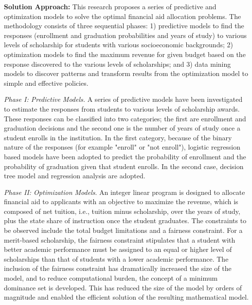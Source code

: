 \documentclass[12pt,english]{report}
\begin{document}
\newpage
\noindent \textbf{Solution Approach:}  This research proposes a series of predictive and optimization models to solve the optimal financial aid allocation problems. The methodology consists of three sequential phases: 1) predictive models to find the responses (enrollment and graduation probabilities and years of study) to various levels of scholarship for students with various socioeconomic backgrounds; 2)  optimization models to find the maximum revenue for given budget based on the response discovered to the various levels of scholarships; and 3) data mining models to discover patterns and transform results from the optimization model to simple and effective policies. %

\vspace*{.1in} 
\noindent \textit{Phase I: Predictive Models.} A series of predictive models have been investigated to estimate the responses from students to various levels of scholarship awards. These responses can be classified into two categories; the first are enrollment and graduation decisions and the second one is the number of years of study once a student enrolls in the institution. In the first category, because of the binary nature of the responses (for example "enroll" or "not enroll"), logistic regression based models have been adopted to predict the probability of enrollment and the probability of graduation given that student enrolls. In the second case, decision tree model and regression analysis are adopted.

\vspace*{.1in} 
\noindent \textit{Phase II: Optimization Models}. An integer linear program is designed to allocate financial aid to applicants with an objective to maximize the revenue, which is composed of net tuition, i.e., tuition minus scholarship, over the years of study, plus the state share of instruction once the student graduates. The constraints to be observed include the total budget limitations and a fairness constraint. For a merit-based scholarship, the fairness constraint stipulates that a student with better academic performance must be assigned to an equal or higher level of scholarships than that of students with a lower academic performance. The inclusion of the fairness constraint has dramatically increased the size of the model, and to reduce computational burden, the concept of a minimum dominance set is developed.  This has reduced the size of the model by orders of magnitude and enabled the efficient solution of the resulting mathematical model. 
\end{document}
